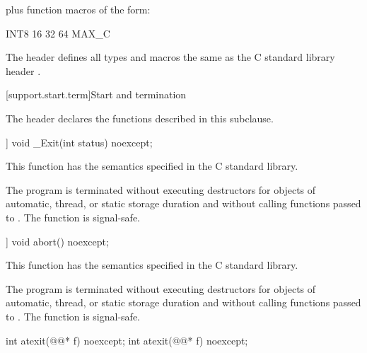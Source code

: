 plus function macros of the form:

\begin{codeblock}
  [U]INT{8 16 32 64 MAX}_C
\end{codeblock}

\pnum
The header defines all types and macros the same as
the C standard library header .


[support.start.term]{Start and termination}

\pnum
{}%
\begin{note}
The header 
declares the functions described in this subclause.
\end{note}

%
\begin{itemdecl}
[[noreturn]] void _Exit(int status) noexcept;
\end{itemdecl}

\begin{itemdescr}
\pnum
\effects
This function has the semantics specified in the C standard library.

\pnum
\remarks
The program is terminated without executing destructors for objects of automatic,
thread, or static storage duration and without calling functions passed to
.
%
The function  is signal-safe.
\end{itemdescr}

%
\begin{itemdecl}
[[noreturn]] void abort() noexcept;
\end{itemdecl}

\begin{itemdescr}
\pnum
\effects
This function has the semantics specified in the C standard library.

\pnum
\remarks
The program is terminated without executing destructors for objects of
automatic, thread, or static storage
duration and without calling functions passed to
.
%
The function  is signal-safe.
\end{itemdescr}

%
\begin{itemdecl}
int atexit(@@* f) noexcept;
int atexit(@@* f) noexcept;
\end{itemdecl}

